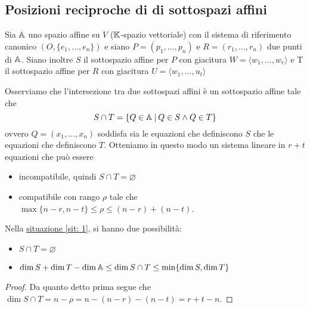 \documentclass{article}     %
\newcommand\sitref[1]{\hyperref[sit: #1]{situazione \ref*{sit: #1}}}
\begin{document}
\subsection{Posizioni reciproche di di sottospazi affini}
\begin{sit}\label{sit: 1}
    Sia $\mathbb{A}$ uno spazio affine su $V$ ($\mathbb{K}$-spazio vettoriale) con il sistema di riferimento canonico $(O,\{e_1,\dots, e_n\})$ e siano $P=(p_1,\dots, p_n)$ e $R=(r_1, \dots, r_n)$ due punti di $\mathbb{A}$. Siano inoltre $S$ il sottospazio affine per $P$ con giacitura $W=\langle w_1, \dots, w_r\rangle$ e T il sottospazio affine per $R$ con giacitura $U=\langle w_1, \dots, u_t\rangle$
\end{sit}

Osserviamo che l'intersezione tra due sottospazi affini è un sottospazio affine tale che
\[S\cap T =\{Q\in \mathbb{A}\:|\:Q\in S \land Q\in T\}\]
ovvero $Q=(x_1, \dots, x_n)$ soddisfa sia le equazioni che definiscono $S$ che le equazioni che definiscono $T$. Otteniamo in questo modo un sistema lineare in $r+t$ equazioni che può essere
\begin{itemize}
    \item incompatibile, quindi $S\cap T=\varnothing$
    \item compatibile con rango $\rho$ tale che $\max\{n-r,n-t\}\leq \rho\leq (n-r)+(n-t)$.
\end{itemize}
\begin{lemma}
    Nella \sitref{1}, si hanno due possibilità:
    \begin{itemize}
        \item $S\cap T=\varnothing$
        \item $\dim S+\dim T -\dim \mathbb{A} \leq \dim S\cap T \leq \min\{\dim S,\dim T\} $
    \end{itemize}
\end{lemma}

\begin{proof}
    Da quanto detto prima segue che $\dim S\cap T = n-\rho = n-(n-r)-(n-t)=r+t-n$.
\end{proof}
\end{document}
